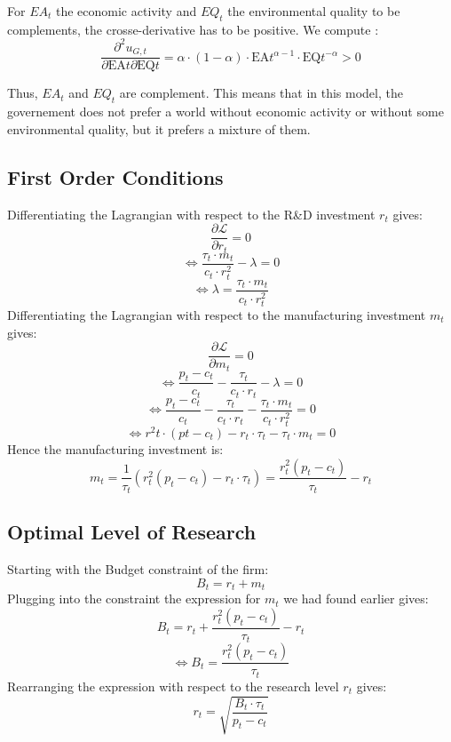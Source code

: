 \documentclass{article}
\begin{document}
For $EA_{t}$ the economic activity and $EQ_{t}$ the environmental quality to be complements, the crosse-derivative has to be positive. 
We compute :  
$$\frac{\partial^2 u_{G,t}}{\partial \text{EA}{t} \partial \text{EQ}{t}}=\alpha\cdot(1-\alpha)\cdot\text{EA}{t}^{\alpha-1}\cdot\text{EQ}{t}^{-\alpha}>0$$

Thus, $EA_{t}$ and $EQ_{t}$ are complement. This means that in this model, the governement does not prefer a world without economic activity or without some environmental quality, but it prefers a mixture of them. 

\subsection{First Order Conditions}
\label{sec:proof3}
Differentiating the Lagrangian with respect to the R\&D investment $r_{t}$ gives:
$$\frac{\partial \mathcal{L}}{\partial r_{t}}=0$$
$$\Leftrightarrow\frac{\tau_{t}\cdot m_{t}}{c_{t}\cdot r^{2}_{t}}-\lambda=0$$
$$\Leftrightarrow\lambda=\frac{\tau_{t}\cdot m_{t}}{c_{t}\cdot r^{2}_{t}}$$
Differentiating the Lagrangian with respect to the manufacturing investment $m_{t}$ gives:
$$\frac{\partial \mathcal{L}}{\partial m_{t}}=0$$
$$\Leftrightarrow\frac{p_{t}-c_{t}}{c_{t}}-\frac{\tau_{t}}{c_{t}\cdot r_{t}}-\lambda=0$$
$$\Leftrightarrow\frac{p_{t}-c_{t}}{c_{t}}-\frac{\tau_{t}}{c_{t}\cdot r_{t}}-\frac{\tau_{t}\cdot m_{t}}{c_{t}\cdot r^{2}_{t}}=0$$
$$\Leftrightarrow{r^{2}{t}}\cdot(p{t}-c_{t})-r_{t}\cdot \tau_{t}-\tau_{t}\cdot m_{t}=0$$
Hence the manufacturing investment is:
\begin{equation}
    m_{t}=\frac{1}{\tau_{t}}\left(r_{t}^{2}(p_{t}-c_{t})-r_{t}\cdot \tau_{t}\right)=\frac{r_{t}^{2}\left(p_{t}-c_{t}\right)}{\tau_{t}}-r_{t}
\end{equation}

\subsection{Optimal Level of Research}
\label{sec:proof4}
Starting with the Budget constraint of the firm:
$$B_{t}=r_{t}+m_{t}$$
Plugging into the constraint the expression for $m_{t}$ we had found earlier gives:
$$B_{t}=r_{t}+\frac{r_{t}^{2}\left(p_{t}-c_{t}\right)}{\tau_{t}}-r_{t}$$
$$\Leftrightarrow{B_{t}=\frac{r_{t}^{2}\left(p_{t}-c_{t}\right)}{\tau_{t}}}$$
Rearranging the expression with respect to the research level ${r_{t}}$ gives:
\begin{equation}
    r_{t}=\sqrt{\frac{B_{t}\cdot \tau_{t}}{p_{t}-c_{t}}}
\end{equation}
\end{document}
